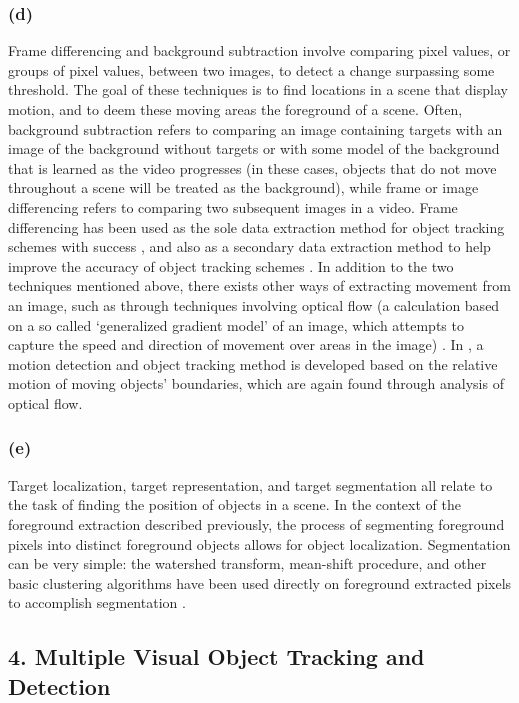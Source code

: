 \documentclass{article}
\begin{document}
\subsubsection*{(d)}
Frame differencing and background subtraction involve comparing pixel values, or groups of pixel values, between two images, to detect a change surpassing some threshold. The goal of these techniques is to find locations in a scene that display motion, and to deem these moving areas the foreground of a scene.  Often, background subtraction refers to comparing an image containing targets with an image of the background without targets or with some model of the background that is learned as the video progresses (in these cases, objects that do not move throughout a scene will be treated as the background), while frame or image differencing refers to comparing two subsequent images in a video. Frame differencing has been used as the sole data extraction method for object tracking schemes with success \citep{pece_2002, beleznai_2006, chu_2007}, and also as a secondary data extraction method to help improve the accuracy of object tracking schemes \citep{perez_2002}. In addition to the two techniques mentioned above, there exists other ways of extracting movement from an image, such as through techniques involving optical flow (a calculation based on a so called `generalized gradient model' of an image, which attempts to capture the speed and direction of movement over areas in the image) \citep{horn_1981, bobick_2001}. In \citep{black_2000}, a motion detection and object tracking method is developed based on the relative motion of moving objects' boundaries, which are again found through analysis of optical flow.

\subsubsection*{(e)}
Target localization, target representation, and target segmentation all relate to the task of finding the position of objects in a scene. In the context of the foreground extraction described previously, the process of segmenting foreground pixels into distinct foreground objects allows for object localization. Segmentation can be very simple: the watershed transform, mean-shift procedure, and other basic clustering algorithms have been used directly on foreground extracted pixels to accomplish segmentation \citep{yang_2006}.




\subsection*{4. Multiple Visual Object Tracking and Detection}
\end{document}
